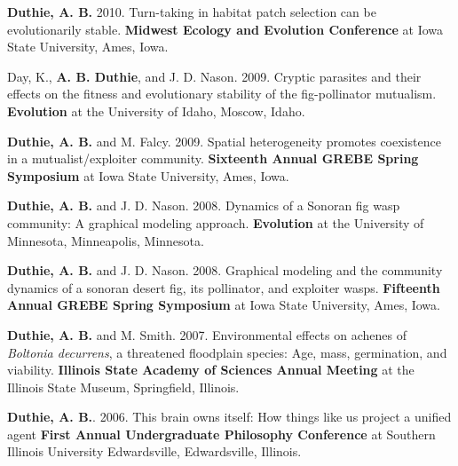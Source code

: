 \documentclass[letterpaper]{article}
\renewenvironment{itemize}{
  \begin{list}{}{
    \setlength{\leftmargin}{1.5em}
  }
}{
  \end{list}
}
\begin{document}
\begin{itemize}
\item {\bf Duthie, A. B.} 2010. Turn-taking in habitat patch selection can be evolutionarily stable. {\bf Midwest Ecology and Evolution Conference} at Iowa State University, Ames, Iowa.
\item Day, K., {\bf A. B. Duthie}, and J. D. Nason. 2009. Cryptic parasites and their effects on the fitness and evolutionary stability of the fig-pollinator mutualism. {\bf Evolution} at the University of Idaho, Moscow, Idaho.
\item {\bf Duthie, A. B.} and M. Falcy. 2009. Spatial heterogeneity promotes coexistence in a mutualist/exploiter community. {\bf Sixteenth Annual GREBE Spring Symposium} at Iowa State University, Ames, Iowa.
\item {\bf Duthie, A. B.} and J. D. Nason. 2008. Dynamics of a Sonoran fig wasp community: A graphical modeling approach. {\bf Evolution} at the University of Minnesota, Minneapolis, Minnesota.
\item {\bf Duthie, A. B.} and J. D. Nason. 2008. Graphical modeling and the community dynamics of a sonoran desert fig, its pollinator, and exploiter wasps. {\bf Fifteenth Annual GREBE Spring Symposium} at Iowa State University, Ames, Iowa.
\item {\bf Duthie, A. B.} and M. Smith. 2007. Environmental effects on achenes of {\it Boltonia decurrens}, a threatened floodplain species: Age, mass, germination, and viability. {\bf Illinois State Academy of Sciences Annual Meeting} at the Illinois State Museum, Springfield, Illinois.
\item {\bf Duthie, A. B.}. 2006. This brain owns itself: How things like us project a unified agent {\bf First Annual Undergraduate Philosophy Conference} at Southern Illinois University Edwardsville, Edwardsville, Illinois.
\end{itemize}
\end{document}
